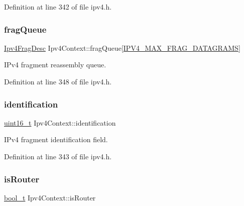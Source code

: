 Definition at line 342 of file ipv4.\+h.

\mbox{\label{structIpv4Context_a771c0a58c87d94217cf62b8872de1215}} 
\subsubsection{\texorpdfstring{frag\+Queue}{fragQueue}}
{\footnotesize\ttfamily \hyperlink{structIpv4FragDesc}{Ipv4\+Frag\+Desc} Ipv4\+Context\+::frag\+Queue\mbox{[}\hyperlink{net__config_8h_a007e85abc30c64c635bd354573ccb669}{I\+P\+V4\+\_\+\+M\+A\+X\+\_\+\+F\+R\+A\+G\+\_\+\+D\+A\+T\+A\+G\+R\+A\+MS}\mbox{]}}



I\+Pv4 fragment reassembly queue. 



Definition at line 348 of file ipv4.\+h.

\mbox{\label{structIpv4Context_a55a5fdb5eaa7d8700f0fa462e54c605c}} 
\subsubsection{\texorpdfstring{identification}{identification}}
{\footnotesize\ttfamily \hyperlink{stdint_8h_a273cf69d639a59973b6019625df33e30}{uint16\+\_\+t} Ipv4\+Context\+::identification}



I\+Pv4 fragment identification field. 



Definition at line 343 of file ipv4.\+h.

\mbox{\label{structIpv4Context_ae9031c47162e51b5dcd1c64168c561bf}} 
\subsubsection{\texorpdfstring{is\+Router}{isRouter}}
{\footnotesize\ttfamily \hyperlink{compiler__port_8h_a812d16e5494522586b3784e55d479912}{bool\+\_\+t} Ipv4\+Context\+::is\+Router}



